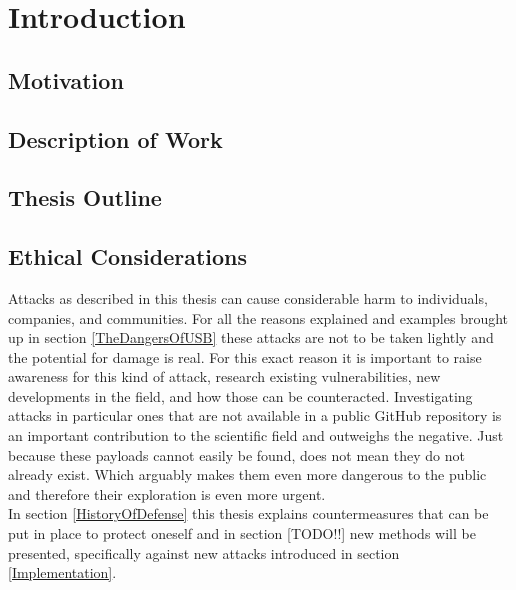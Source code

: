 \chapter{Introduction}

\section{Motivation}
\cite{label}

\section{Description of Work}


\section{Thesis Outline}


\section{Ethical Considerations}
Attacks as described in this thesis can cause considerable harm to individuals, companies, and communities. For all the reasons explained and examples brought up in section \ref{TheDangersOfUSB} these attacks are not to be taken lightly and the potential for damage is real. For this exact reason it is important to raise awareness for this kind of attack, research existing vulnerabilities, new developments in the field, and how those can be counteracted. Investigating attacks in particular ones that are not available in a public GitHub repository is an important contribution to the scientific field and outweighs the negative. Just because these payloads cannot easily be found, does not mean they do not already exist. Which arguably makes them even more dangerous to the public and therefore their exploration is even more urgent. \\
In section \ref{HistoryOfDefense} this thesis explains countermeasures that can be put in place to protect oneself and in section [TODO!!] new methods will be presented, specifically against new attacks introduced in section \ref{Implementation}.


